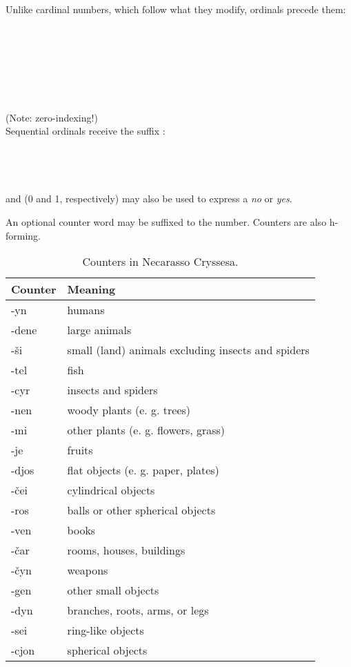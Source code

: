 \documentclass{book}
\begin{document}
Unlike cardinal numbers, which follow what they modify, ordinals precede them: \\
~\\
  \\
  \\
  \\
~\\
  \\
  \\
  (Note: zero-indexing!) \\

Sequential ordinals receive the suffix : \\
~\\
    \\
    \\
    \\

 and  (0 and 1, respectively) may also be used to express a \emph{no} or \emph{yes}.

An optional counter word may be suffixed to the number. Counters are also h-forming.

\begin{table}[H]
  \caption{Counters in Necarasso Cryssesa.}
  \centering
	\begin{tabular}{|l|l|}
	  \hline
	  Counter & Meaning \\ \hline
	  -yn & humans \\
	  -dene & large animals \\
	  -ši & small (land) animals excluding insects and spiders \\
	  -tel & fish \\
	  -cyr & insects and spiders \\
	  -nen & woody plants (e. g. trees) \\
	  -mi & other plants (e. g. flowers, grass) \\
	  -je & fruits \\
	  -djos & flat objects (e. g. paper, plates) \\
	  -čei & cylindrical objects \\
	  -ros & balls or other spherical objects \\
	  -ven & books \\
	  -čar & rooms, houses, buildings \\
	  -čyn & weapons \\
	  -gen & other small objects \\
	  -dyn & branches, roots, arms, or legs \\
	  -sei & ring-like objects \\
	  -cjon & spherical objects \\ \hline
	\end{tabular}
\end{table}
\end{document}
